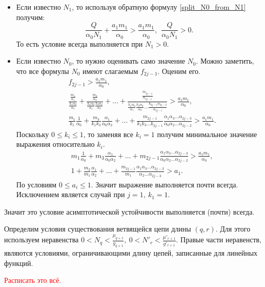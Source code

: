 \begin{itemize}
    \item Если известно \(N_1\), то используя обратную формулу \eqref{split_N0_from_N1} получим:
    \begin{equation*}
        \frac{Q}{\alpha_0 N_1} + \frac{a_1 m_1}{\alpha_0} > \frac{a_1 m_1}{\alpha_0}, ~~ \frac{Q}{\alpha_0 N_1} > 0.
    \end{equation*}
    То есть условие всегда выполняется при \(N_1 > 0\).

    \item Если известно \(N_0\), то нужно оценивать само значение \(N_0\). Можно заметить, что все формулы \(N_0\) имеют слагаемым \(f_{2j-1}\). Оценим его.
    \begin{equation} \label{split_f2jm1_stab}
        \begin{split}
            & f_{2j-1} > \frac{a_1 m_1}{\alpha_0}, \\
            & \frac{\frac{m_1}{\alpha_1}}{\frac{k_1 \alpha_0}{\alpha_1}} + \frac{\frac{m_3}{\alpha_3}}{\frac{k_1 \alpha_0}{\alpha_1} \frac{k_3 \alpha_2}{\alpha_3}} + \dots + \frac{\frac{m_{2j-1}}{\alpha_{2j-1}}}{\frac{k_1 \alpha_0}{\alpha_1} \frac{k_3 \alpha_2}{\alpha_3} \dots \frac{k_{2j-1} \alpha_{2j-2}}{\alpha_{2j-1}}} > \frac{a_1 m_1}{\alpha_0}, \\
            & \frac{m_1}{k_1} \frac{1}{\alpha_0} + \frac{m_3}{k_1 k_3} \frac{\alpha_1}{\alpha_0 \alpha_2} + \dots + \frac{m_{2j-1}}{k_1 k_3 \dots k_{2j-1}} \frac{\alpha_1 \alpha_3 \dots \alpha_{2j-3}}{\alpha_0 \alpha_2 \dots \alpha_{2j-2}}> \frac{a_1 m_1}{\alpha_0}.
        \end{split}
    \end{equation}
    Поскольку \(0 \leq k_i \leq 1\), то заменяя все \(k_i = 1\) получим минимальное значение выражения относительно \(k_i\).
    \begin{equation*}
        \begin{split}
            & m_1 \frac{1}{\alpha_0} + m_3 \frac{\alpha_1}{\alpha_0 \alpha_2} + \dots + m_{2j-1} \frac{\alpha_1 \alpha_3 \dots \alpha_{2j-3}}{\alpha_0 \alpha_2 \dots \alpha_{2j-2}}> \frac{a_1 m_1}{\alpha_0}, \\
            & 1 + \frac{m_3}{m_1} \frac{\alpha_1}{\alpha_2} + \dots + \frac{m_{2j-1}}{m_1} \frac{\alpha_1 \alpha_3 \dots \alpha_{2j-3}}{\alpha_2 \dots \alpha_{2j-2}} > a_1.
        \end{split}
    \end{equation*}
    По условиям \(0 \leq a_i \leq 1\). Значит выражение выполняется почти всегда. Исключением является случай при \(j = 1, ~ k_1 = 1\).
\end{itemize}

Значит это условие асимптотической устойчивости выполняется (почти) всегда.

Определим условия существования ветвящейся цепи длины \((q, r)\). Для этого используем неравенства \(0 < N_q < \frac{\mu_{q+1}}{g_{q+1}}, ~ 0 < N'_r < \frac{\mu'_{r+1}}{g'_{r+1}}\). Правые части неравенств, являются условиями, ограничивающими длину цепей, записанные для линейных функций. 

\textcolor{red}{Расписать это всё.}